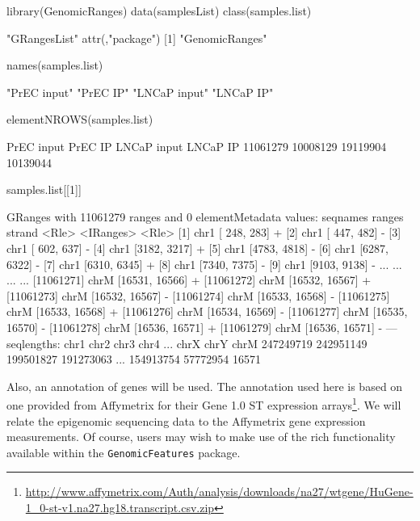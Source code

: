 \begin{Schunk}
\begin{Sinput}
 library(GenomicRanges)
 data(samplesList)
 class(samples.list)
\end{Sinput}
\begin{Soutput}
[1] "GRangesList"
attr(,"package")
[1] "GenomicRanges"
\end{Soutput}
\begin{Sinput}
 names(samples.list)
\end{Sinput}
\begin{Soutput}
[1] "PrEC input"  "PrEC IP"     "LNCaP input" "LNCaP IP"   
\end{Soutput}
\begin{Sinput}
 elementNROWS(samples.list)
\end{Sinput}
\begin{Soutput}
 PrEC input     PrEC IP LNCaP input    LNCaP IP 
   11061279    10008129    19119904    10139044 
\end{Soutput}
\begin{Sinput}
 samples.list[[1]]
\end{Sinput}
\begin{Soutput}
GRanges with 11061279 ranges and 0 elementMetadata values:
             seqnames         ranges strand
                <Rle>      <IRanges>  <Rle>
         [1]     chr1   [ 248,  283]      +
         [2]     chr1   [ 447,  482]      -
         [3]     chr1   [ 602,  637]      -
         [4]     chr1   [3182, 3217]      +
         [5]     chr1   [4783, 4818]      -
         [6]     chr1   [6287, 6322]      -
         [7]     chr1   [6310, 6345]      +
         [8]     chr1   [7340, 7375]      -
         [9]     chr1   [9103, 9138]      -
         ...      ...            ...    ...
  [11061271]     chrM [16531, 16566]      +
  [11061272]     chrM [16532, 16567]      +
  [11061273]     chrM [16532, 16567]      -
  [11061274]     chrM [16533, 16568]      -
  [11061275]     chrM [16533, 16568]      +
  [11061276]     chrM [16534, 16569]      -
  [11061277]     chrM [16535, 16570]      -
  [11061278]     chrM [16536, 16571]      +
  [11061279]     chrM [16536, 16571]      -
  ---
  seqlengths:
        chr1      chr2      chr3      chr4 ...      chrX      chrY      chrM
   247249719 242951149 199501827 191273063 ... 154913754  57772954     16571
\end{Soutput}
\end{Schunk}

Also, an annotation of genes will be used. The annotation used here is based on one provided from Affymetrix for their Gene 1.0 ST expression arrays\footnote{\href{http://www.affymetrix.com/Auth/analysis/downloads/na27/wtgene/HuGene-1\_0-st-v1.na27.hg18.transcript.csv.zip}{http://www.affymetrix.com/Auth/analysis/downloads/na27/wtgene/HuGene-1\_0-st-v1.na27.hg18.transcript.csv.zip}}. We will relate the epigenomic sequencing data to the Affymetrix gene expression measurements.  Of course, users may wish to make use of the rich functionality available within the \texttt{GenomicFeatures} package.
 
